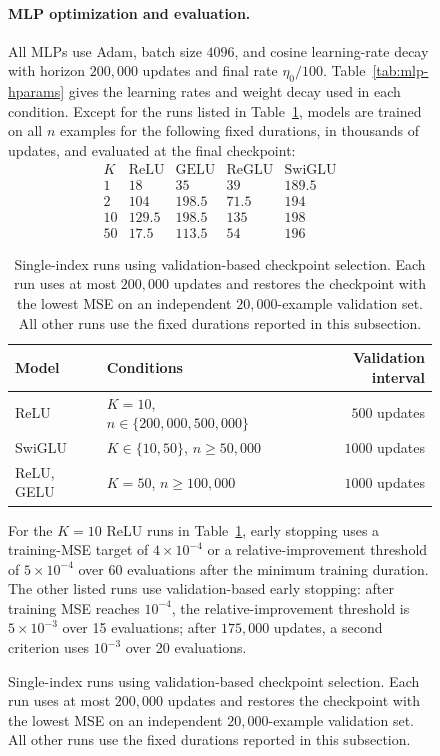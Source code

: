 \documentclass{article}
\newcounter{model}[section]
\begin{document}
\begin{figure}
\paragraph{MLP optimization and evaluation.}
All MLPs use Adam, batch size \(4096\), and cosine learning-rate decay
with horizon \(200{,}000\) updates and final rate \(\eta_0/100\).
Table~\ref{tab:mlp-hparams} gives the learning rates and weight decay
used in each condition. Except for the runs listed in
Table~\ref{tab:validation-protocol}, models are trained on all \(n\)
examples for the following fixed durations, in thousands of updates,
and evaluated at the final checkpoint:
\[
\begin{array}{c|cccc}
K & \text{ReLU} & \text{GELU} & \text{ReGLU} & \text{SwiGLU}\\
\hline
1  & 18    & 35    & 39   & 189.5\\
2  & 104   & 198.5 & 71.5 & 194\\
10 & 129.5 & 198.5 & 135  & 198\\
50 & 17.5  & 113.5 & 54   & 196
\end{array}
\]

\begin{table}[t]
\centering
\small
\renewcommand{\arraystretch}{1.12}
\setlength{\tabcolsep}{4pt}
\caption{Single-index runs using validation-based checkpoint selection.
Each run uses at most \(200{,}000\) updates and restores the checkpoint
with the lowest MSE on an independent \(20{,}000\)-example validation set.
All other runs use the fixed durations reported in this subsection.}
\label{tab:validation-protocol}
\begin{tabularx}{\textwidth}{@{}lXr@{}}
\toprule
Model & Conditions & Validation interval \\
\midrule
ReLU & \(K=10\), \(n\in\{200{,}000,500{,}000\}\) & \(500\) updates \\
SwiGLU & \(K\in\{10,50\}\), \(n\geq50{,}000\) & \(1000\) updates \\
ReLU, GELU & \(K=50\), \(n\geq100{,}000\) & \(1000\) updates \\
\bottomrule
\end{tabularx}
\end{table}

For the \(K=10\) ReLU runs in Table~\ref{tab:validation-protocol},
early stopping uses a training-MSE target of \(4\times10^{-4}\) or a
relative-improvement threshold of \(5\times10^{-4}\) over 60 evaluations
after the minimum training duration.
The other listed runs use validation-based early stopping: after training
MSE reaches \(10^{-4}\), the relative-improvement threshold is
\(5\times10^{-3}\) over 15 evaluations; after \(175{,}000\) updates,
a second criterion uses \(10^{-3}\) over 20 evaluations.


\end{figure}
\end{document}
